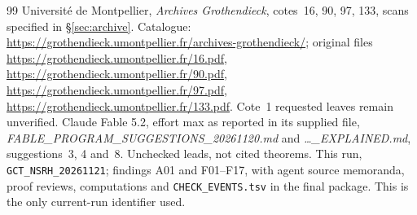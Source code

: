 \documentclass[11pt,a4paper]{article}
\theoremstyle{named}\newtheorem{finding}{Finding}[section]
\theoremstyle{definition}\newtheorem{definition}[finding]{Definition}
\theoremstyle{remark}\newtheorem{remark}[finding]{Remark}
\begin{document}
\begin{thebibliography}{99}
 Universit\'e de Montpellier, \emph{Archives Grothendieck}, cotes~16, 90, 97, 133, scans specified in \S\ref{sec:archive}. Catalogue: \url{https://grothendieck.umontpellier.fr/archives-grothendieck/}; original files \url{https://grothendieck.umontpellier.fr/16.pdf}, \url{https://grothendieck.umontpellier.fr/90.pdf}, \url{https://grothendieck.umontpellier.fr/97.pdf}, \url{https://grothendieck.umontpellier.fr/133.pdf}. Cote~1 requested leaves remain unverified.
 Claude Fable 5.2, effort max as reported in its supplied file, \emph{FABLE\_PROGRAM\_SUGGESTIONS\_20261120.md} and \emph{\ldots\_EXPLAINED.md}, suggestions~3, 4 and~8. Unchecked leads, not cited theorems.
 This run, \texttt{GCT\_NSRH\_20261121}; findings A01 and F01--F17, with agent source memoranda, proof reviews, computations and \texttt{CHECK\_EVENTS.tsv} in the final package. This is the only current-run identifier used.
\end{thebibliography}
\end{document}
